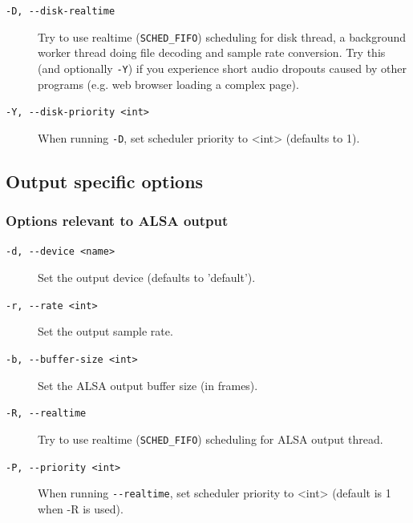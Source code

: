 \documentclass[10pt,english]{article}
\begin{document}
\begin{description}

\item [
\texttt{-D, {-}{-}disk-realtime}
]

Try to use realtime (\texttt{SCHED\_FIFO}) scheduling
for disk thread, a background worker thread doing file
decoding and sample rate conversion. Try this (and
optionally \texttt{-Y}) if you experience short audio
dropouts caused by other programs (e.g. web browser loading
a complex page).

\item [
\texttt{-Y, {-}{-}disk-priority <int>}
]

When running \texttt{-D}, set scheduler priority to
<int> (defaults to 1).

\end{description}



\subsection{Output specific options\label{idp362208}}

\subsubsection{Options relevant to ALSA output\label{idp362736}}

\begin{description}

\item [
\texttt{-d, {-}{-}device <name>}
]

Set the output device (defaults to 'default').

\item [
\texttt{-r, {-}{-}rate <int>}
]

Set the output sample rate.

\item [
\texttt{-b, {-}{-}buffer-size <int>}
]

Set the ALSA output buffer size (in frames).

\item [
\texttt{-R, {-}{-}realtime}
]

Try to use realtime (\texttt{SCHED\_FIFO}) scheduling
for ALSA output thread.

\item [
\texttt{-P, {-}{-}priority <int>}
]

When running \texttt{{-}{-}realtime}, set scheduler
priority to <int> (default is 1 when -R is used).

\end{description}
\end{document}
